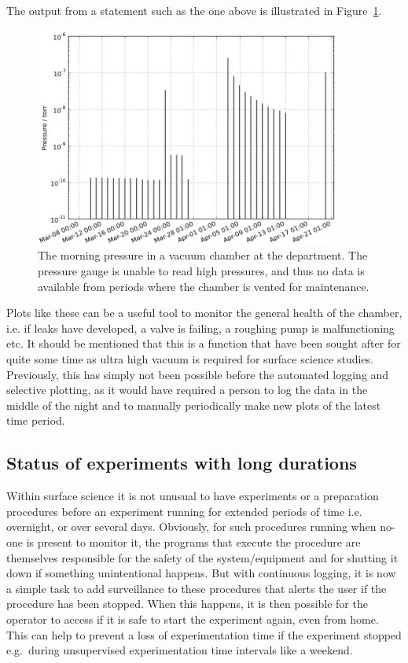 The output from a statement such as the one above is illustrated in
Figure~\ref{fig:morning_pressure}.
\begin{figure}
 \begin{center}
 \includegraphics[width=10cm]{morning_pressure.png}
 \caption{ The morning pressure in a vacuum chamber at the department. The
   pressure gauge is unable to read high pressures, and thus no data is
   available from periods where the chamber is vented for maintenance.
   \label{fig:morning_pressure}
 } 
 \end{center} 
\end{figure} 
Plots like these can be a useful tool to monitor the general health of the
chamber, i.e. if leaks have developed, a valve is failing, a roughing pump is
malfunctioning etc. It should be mentioned that this is a function that have
been sought after for quite some time as ultra high vacuum is required for
surface science studies. Previously, this has simply not been possible before
the automated logging and selective plotting, as it would have required a
person to log the data in the middle of the night and to manually periodically
make new plots of the latest time period.

\subsection{Status of experiments with long durations} 
Within surface science it is not unusual to have experiments or a preparation
procedures before an experiment running for extended periods of time i.e.
overnight, or over several days. Obviously, for such procedures running when
no-one is present to monitor it, the programs that execute the procedure are
themselves responsible for the safety of the system/equipment and for shutting
it down if something unintentional happens. But with continuous logging, it is
now a simple task to add surveillance to these procedures that alerts the user
if the procedure has been stopped. When this happens, it is then possible for
the operator to access if it is safe to start the experiment again, even from
home. This can help to prevent a loss of experimentation time if the experiment
stopped e.g.\ during unsupervised experimentation time intervals like a
weekend.

